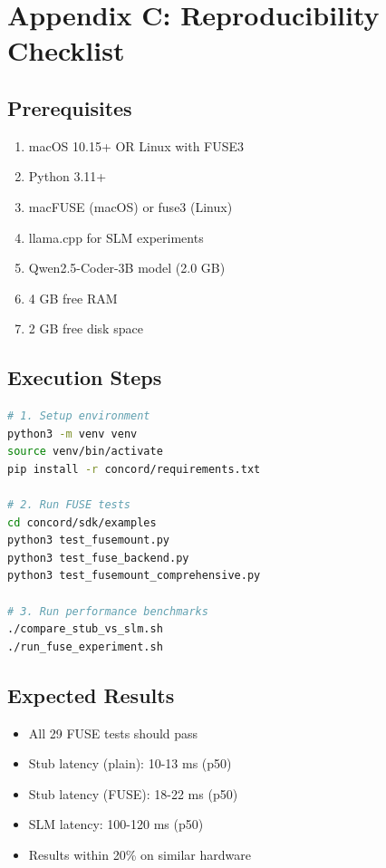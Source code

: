 \documentclass[11pt]{article}
\begin{document}
\section{Appendix C: Reproducibility Checklist}

\subsection{Prerequisites}
\begin{enumerate}
\item macOS 10.15+ OR Linux with FUSE3
\item Python 3.11+
\item macFUSE (macOS) or fuse3 (Linux)
\item llama.cpp for SLM experiments
\item Qwen2.5-Coder-3B model (2.0 GB)
\item 4 GB free RAM
\item 2 GB free disk space
\end{enumerate}

\subsection{Execution Steps}
\begin{lstlisting}[language=bash]
# 1. Setup environment
python3 -m venv venv
source venv/bin/activate
pip install -r concord/requirements.txt

# 2. Run FUSE tests
cd concord/sdk/examples
python3 test_fusemount.py
python3 test_fuse_backend.py
python3 test_fusemount_comprehensive.py

# 3. Run performance benchmarks
./compare_stub_vs_slm.sh
./run_fuse_experiment.sh
\end{lstlisting}

\subsection{Expected Results}
\begin{itemize}
\item All 29 FUSE tests should pass
\item Stub latency (plain): 10-13 ms (p50)
\item Stub latency (FUSE): 18-22 ms (p50)
\item SLM latency: 100-120 ms (p50)
\item Results within 20\% on similar hardware
\end{itemize}
\end{document}
